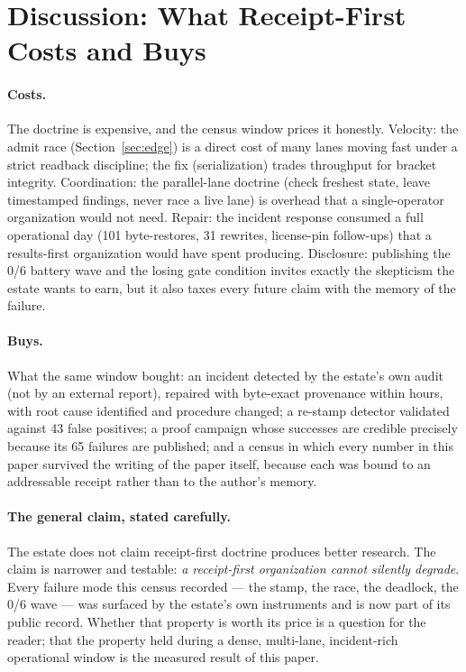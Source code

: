 \section{Discussion: What Receipt-First Costs and Buys}
\label{sec:discussion}

\paragraph{Costs.} The doctrine is expensive, and the census window prices it honestly. Velocity: the admit race (Section~\ref{sec:edge}) is a direct cost of many lanes moving fast under a strict readback discipline; the fix (serialization) trades throughput for bracket integrity. Coordination: the parallel-lane doctrine (check freshest state, leave timestamped findings, never race a live lane) is overhead that a single-operator organization would not need. Repair: the incident response consumed a full operational day (101 byte-restores, 31 rewrites, license-pin follow-ups) that a results-first organization would have spent producing. Disclosure: publishing the 0/6 battery wave and the losing gate condition invites exactly the skepticism the estate wants to earn, but it also taxes every future claim with the memory of the failure.

\paragraph{Buys.} What the same window bought: an incident detected by the estate's own audit (not by an external report), repaired with byte-exact provenance within hours, with root cause identified and procedure changed; a re-stamp detector validated against 43 false positives; a proof campaign whose successes are credible precisely because its 65 failures are published; and a census in which every number in this paper survived the writing of the paper itself, because each was bound to an addressable receipt rather than to the author's memory.

\paragraph{The general claim, stated carefully.} The estate does not claim receipt-first doctrine produces better research. The claim is narrower and testable: \emph{a receipt-first organization cannot silently degrade}. Every failure mode this census recorded --- the stamp, the race, the deadlock, the 0/6 wave --- was surfaced by the estate's own instruments and is now part of its public record. Whether that property is worth its price is a question for the reader; that the property held during a dense, multi-lane, incident-rich operational window is the measured result of this paper.
